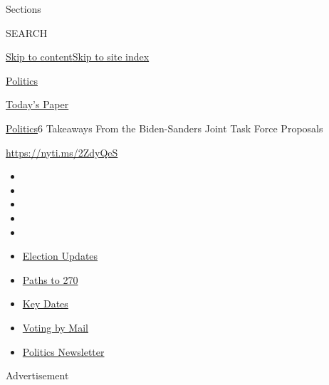 Sections

SEARCH

\protect\hyperlink{site-content}{Skip to
content}\protect\hyperlink{site-index}{Skip to site index}

\href{https://www.nytimes3xbfgragh.onion/section/politics}{Politics}

\href{https://myaccount.nytimes3xbfgragh.onion/auth/login?response_type=cookie\&client_id=vi}{}

\href{https://www.nytimes3xbfgragh.onion/section/todayspaper}{Today's
Paper}

\href{/section/politics}{Politics}\textbar{}6 Takeaways From the
Biden-Sanders Joint Task Force Proposals

\url{https://nyti.ms/2ZdyQeS}

\begin{itemize}
\item
\item
\item
\item
\item
\end{itemize}

\begin{itemize}
\item
  \href{https://www.nytimes3xbfgragh.onion/live/2020/09/11/us/trump-vs-biden?action=click\&pgtype=Article\&state=default\&region=TOP_BANNER\&context=storylines_menu}{Election
  Updates}
\item
  \href{https://www.nytimes3xbfgragh.onion/interactive/2020/us/elections/election-states-biden-trump.html?action=click\&pgtype=Article\&state=default\&region=TOP_BANNER\&context=storylines_menu}{Paths
  to 270}
\item
  \href{https://www.nytimes3xbfgragh.onion/interactive/2019/us/elections/2020-presidential-election-calendar.html?action=click\&pgtype=Article\&state=default\&region=TOP_BANNER\&context=storylines_menu}{Key
  Dates}
\item
  \href{https://www.nytimes3xbfgragh.onion/interactive/2020/08/31/us/politics/vote-by-mail-deadlines.html?action=click\&pgtype=Article\&state=default\&region=TOP_BANNER\&context=storylines_menu}{Voting
  by Mail}
\item
  \href{https://www.nytimes3xbfgragh.onion/newsletters/politics?action=click\&pgtype=Article\&state=default\&region=TOP_BANNER\&context=storylines_menu}{Politics
  Newsletter}
\end{itemize}

Advertisement

